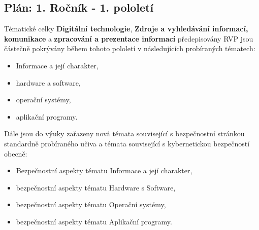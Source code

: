 \documentclass[a4paper, 12pt]{article}
\begin{document}
\subsection{Plán: 1. Ročník - 1. pololetí}

Tématické celky \textbf{Digitální technologie}, \textbf{Zdroje a vyhledávání informací, komunikace} a \textbf{zpracování a prezentace informací} předepisovány RVP jsou částečně pokrývány během tohoto pololetí v následujících probíraných tématech:
\begin{itemize}
    \setlength{\itemsep}{-3pt}
    \item Informace a její charakter,
    \item hardware a software,
    \item operační systémy,
    \item aplikační programy.
\end{itemize}

Dále jsou do výuky zařazeny nová témata související s bezpečnostní stránkou standardně probíraného učiva a témata související s kybernetickou bezpečností obecně:
\begin{itemize}
    \setlength{\itemsep}{-3pt}
    \item Bezpečnostní aspekty tématu Informace a její charakter,
    \item bezpečnostní aspekty tématu Hardware s Software,
    \item bezpečnostní aspekty tématu Operační systémy,
    \item bezpečnostní aspekty tématu Aplikační programy.
\end{itemize}
\end{document}
